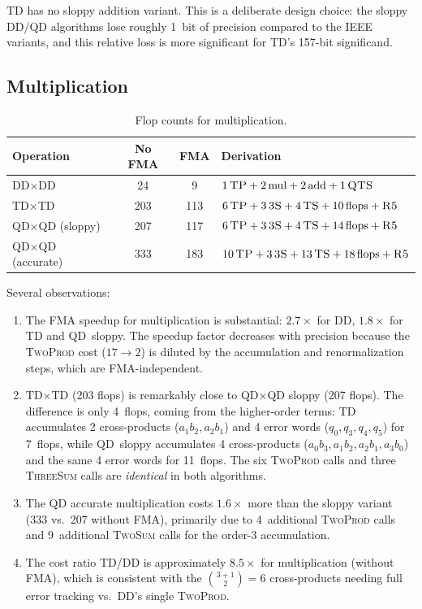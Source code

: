 \documentclass[11pt,a4paper]{article}
\begin{document}
TD has no sloppy addition variant.  This is a deliberate design
choice: the sloppy DD/QD algorithms lose roughly 1~bit of precision
compared to the IEEE variants, and this relative loss is more
significant for TD's 157-bit significand.

\subsection{Multiplication}

\begin{table}[h]
\centering
\caption{Flop counts for multiplication.}
\label{tab:mul-flops}
\begin{tabular}{lccl}
\toprule
Operation & No FMA & FMA & Derivation \\
\midrule
DD$\times$DD
  & 24 & 9
  & $1\,\textsc{TP} + 2\,\text{mul} + 2\,\text{add}
    + 1\,\textsc{QTS}$ \\
TD$\times$TD
  & 203 & 113
  & $6\,\textsc{TP} + 3\,\textsc{3S} + 4\,\textsc{TS}
    + 10\,\text{flops} + \textsc{R5}$ \\
QD$\times$QD (sloppy)
  & 207 & 117
  & $6\,\textsc{TP} + 3\,\textsc{3S} + 4\,\textsc{TS}
    + 14\,\text{flops} + \textsc{R5}$ \\
QD$\times$QD (accurate)
  & 333 & 183
  & $10\,\textsc{TP} + 3\,\textsc{3S} + 13\,\textsc{TS}
    + 18\,\text{flops} + \textsc{R5}$ \\
\bottomrule
\end{tabular}
\end{table}

Several observations:

\begin{enumerate}
\item The FMA speedup for multiplication is substantial: $2.7\times$
  for DD, $1.8\times$ for TD and QD~sloppy.  The speedup factor
  decreases with precision because the \textsc{TwoProd} cost
  ($17 \to 2$) is diluted by the accumulation and renormalization
  steps, which are FMA-independent.

\item TD$\times$TD (203 flops) is remarkably close to QD$\times$QD
  sloppy (207 flops).  The difference is only 4~flops, coming from
  the higher-order terms: TD accumulates 2 cross-products ($a_1 b_2,
  a_2 b_1$) and 4 error words ($q_0, q_3, q_4, q_5$) for 7~flops,
  while QD~sloppy accumulates 4 cross-products ($a_0 b_3, a_1 b_2,
  a_2 b_1, a_3 b_0$) and the same 4 error words for 11~flops.  The
  six \textsc{TwoProd} calls and three \textsc{ThreeSum} calls are
  \emph{identical} in both algorithms.

\item The QD accurate multiplication costs $1.6\times$ more than
  the sloppy variant (333 vs.\ 207 without FMA), primarily due to
  4~additional \textsc{TwoProd} calls and 9~additional
  \textsc{TwoSum} calls for the order-3 accumulation.

\item The cost ratio TD/DD is approximately $8.5\times$ for
  multiplication (without FMA), which is consistent with the
  $\binom{3+1}{2} = 6$ cross-products needing full error tracking
  vs.\ DD's single \textsc{TwoProd}.
\end{enumerate}
\end{document}
